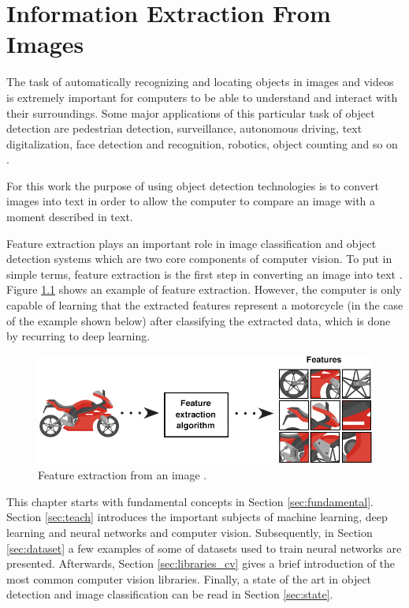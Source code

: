 \cleardoublepage


\chapter{Information Extraction From Images}
\label{ch:computervision}



The task of automatically recognizing and locating objects in images and videos is extremely important for computers to be able to understand and interact with their surroundings. Some major applications of this particular task of object detection are pedestrian detection, surveillance, autonomous driving, text digitalization, face detection and recognition, robotics, object counting and so on \cite{Agarwal2019}. 

For this work the purpose of using object detection technologies is to convert images into text in order to allow the computer to compare an image with a moment described in text.

Feature extraction plays an important role in image classification and object detection systems which are two core components of computer vision. To put in simple terms, feature extraction is the first step in converting an image into text \cite{Tiwari2013}. Figure \ref{fig:feature_extraction} shows an example of feature extraction. However, the computer is only capable of learning that the extracted features represent a motorcycle (in the case of the example shown below) after classifying the extracted data, which is done by recurring to deep learning.





\begin{figure}[H]
    \centering
    \includegraphics[scale = 0.55]{Sections/2StateOfTheArt/2_images/Feature_extraction.png}
    \caption[Feature extraction from an image.]{Feature extraction from an image \cite{feature}.}  
    \label{fig:feature_extraction}
\end{figure}


\par This chapter starts with fundamental concepts in Section \ref{sec:fundamental}. Section \ref{sec:teach} introduces the important subjects of machine learning, deep learning and neural networks and computer vision. Subsequently, in Section \ref{sec:dataset} a few examples of some of datasets used to train neural networks are presented. Afterwards, Section \ref{sec:libraries_cv} gives a brief introduction of the most common computer vision libraries.  Finally, a state of the art in object detection and image classification can be read in Section \ref{sec:state}.

